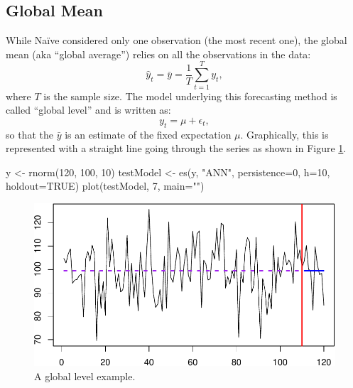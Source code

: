 \documentclass[
]{book}
\newenvironment{Shaded}{\begin{snugshade}}{\end{snugshade}}
\newcommand{\AttributeTok}[1]{\textcolor[rgb]{0.77,0.63,0.00}{#1}}
\newcommand{\ConstantTok}[1]{\textcolor[rgb]{0.00,0.00,0.00}{#1}}
\newcommand{\DecValTok}[1]{\textcolor[rgb]{0.00,0.00,0.81}{#1}}
\newcommand{\FunctionTok}[1]{\textcolor[rgb]{0.00,0.00,0.00}{#1}}
\newcommand{\NormalTok}[1]{#1}
\newcommand{\OtherTok}[1]{\textcolor[rgb]{0.56,0.35,0.01}{#1}}
\newcommand{\StringTok}[1]{\textcolor[rgb]{0.31,0.60,0.02}{#1}}
\theoremstyle{definition}
\theoremstyle{definition}
\theoremstyle{definition}
\theoremstyle{definition}
\theoremstyle{remark}
\begin{document}
\hypertarget{GlobalMean}{%
\subsection{Global Mean}\label{GlobalMean}}

While Naïve considered only one observation (the most recent one), the global mean (aka ``global average'') relies on all the observations in the data:
\begin{equation}
    \hat{y}_t = \bar{y} = \frac{1}{T} \sum_{t=1}^T y_{t} ,
    \label{eq:GlobalMean}
\end{equation}
where \(T\) is the sample size. The model underlying this forecasting method is called ``global level'' and is written as:
\begin{equation}
    y_t = \mu + \epsilon_t,
    \label{eq:GlobalLevel}
\end{equation}
so that the \(\bar{y}\) is an estimate of the fixed expectation \(\mu\). Graphically, this is represented with a straight line going through the series as shown in Figure \ref{fig:globalMeanExample}.

\begin{Shaded}
\begin{Highlighting}[]
\NormalTok{y }\OtherTok{\textless{}{-}} \FunctionTok{rnorm}\NormalTok{(}\DecValTok{120}\NormalTok{, }\DecValTok{100}\NormalTok{, }\DecValTok{10}\NormalTok{)}
\NormalTok{testModel }\OtherTok{\textless{}{-}} \FunctionTok{es}\NormalTok{(y, }\StringTok{"ANN"}\NormalTok{, }\AttributeTok{persistence=}\DecValTok{0}\NormalTok{,}
                 \AttributeTok{h=}\DecValTok{10}\NormalTok{, }\AttributeTok{holdout=}\ConstantTok{TRUE}\NormalTok{)}
\FunctionTok{plot}\NormalTok{(testModel, }\DecValTok{7}\NormalTok{, }\AttributeTok{main=}\StringTok{""}\NormalTok{)}
\end{Highlighting}
\end{Shaded}

\begin{figure}
\centering
\includegraphics{Svetunkov--2022----ADAM_files/figure-latex/globalMeanExample-1.pdf}
\caption{\label{fig:globalMeanExample}A global level example.}
\end{figure}
\end{document}
